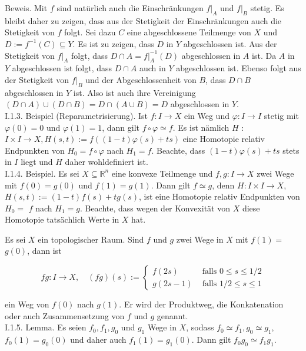 \documentclass[10pt]{article}
\begin{document}
Beweis. Mit $f$ sind natürlich auch die Einschränkungen $\left.f\right|_{A}$ und $\left.f\right|_{B}$ stetig. Es bleibt daher zu zeigen, dass aus der Stetigkeit der Einschränkungen auch die Stetigkeit von $f$ folgt. Sei dazu $C$ eine abgeschlossene Teilmenge von $X$ und $D:=f^{-1}(C) \subseteq Y$. Es ist zu zeigen, dass $D$ in $Y$ abgeschlossen ist. Aus der Stetigkeit von $\left.f\right|_{A}$ folgt, dass $D \cap A=\left.f\right|_{A} ^{-1}(D)$ abgeschlossen in $A$ ist. Da $A$ in $Y$ abgeschlossen ist folgt, dass $D \cap A$ auch in $Y$ abgeschlossen ist. Ebenso folgt aus der Stetigkeit von $\left.f\right|_{B}$ und der Abgeschlossenheit von $B$, dass $D \cap B$ abgeschlossen in $Y$ ist. Also ist auch ihre Vereinigung $(D \cap A) \cup(D \cap B)=D \cap(A \cup B)=D$ abgeschlossen in $Y$.\\
I.1.3. Beispiel (Reparametrisierung). Ist $f: I \rightarrow X$ ein Weg und $\varphi: I \rightarrow I$ stetig mit $\varphi(0)=0$ und $\varphi(1)=1$, dann gilt $f \circ \varphi \simeq f$. Es ist nämlich $H$ : $I \times I \rightarrow X, H(s, t):=f((1-t) \varphi(s)+t s)$ eine Homotopie relativ Endpunkten von $H_{0}=f \circ \varphi$ nach $H_{1}=f$. Beachte, dass $(1-t) \varphi(s)+t s$ stets in $I$ liegt und $H$ daher wohldefiniert ist.\\
I.1.4. Beispiel. Es sei $X \subseteq \mathbb{R}^{n}$ eine konvexe Teilmenge und $f, g: I \rightarrow X$ zwei Wege mit $f(0)=g(0)$ und $f(1)=g(1)$. Dann gilt $f \simeq g$, denn $H: I \times I \rightarrow X$, $H(s, t):=(1-t) f(s)+t g(s)$, ist eine Homotopie relativ Endpunkten von $H_{0}=$ $f$ nach $H_{1}=g$. Beachte, dass wegen der Konvexität von $X$ diese Homotopie tatsächlich Werte in $X$ hat.

Es sei $X$ ein topologischer Raum. Sind $f$ und $g$ zwei Wege in $X$ mit $f(1)=$ $g(0)$, dann ist

$$
f g: I \rightarrow X, \quad(f g)(s):= \begin{cases}f(2 s) & \text { falls } 0 \leq s \leq 1 / 2 \\ g(2 s-1) & \text { falls } 1 / 2 \leq s \leq 1\end{cases}
$$

ein Weg von $f(0)$ nach $g(1)$. Er wird der Produktweg, die Konkatenation oder auch Zusammensetzung von $f$ und $g$ genannt.\\
I.1.5. Lemma. Es seien $f_{0}, f_{1}, g_{0}$ und $g_{1}$ Wege in $X$, sodass $f_{0} \simeq f_{1}, g_{0} \simeq g_{1}$, $f_{0}(1)=g_{0}(0)$ und daher auch $f_{1}(1)=g_{1}(0)$. Dann gilt $f_{0} g_{0} \simeq f_{1} g_{1}$.
\end{document}
